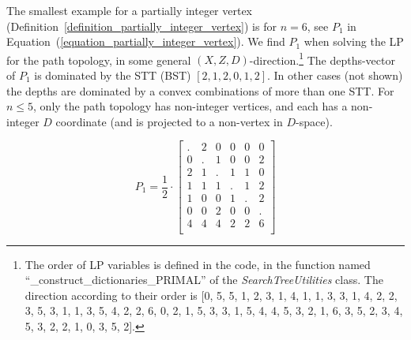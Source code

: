 \begin{example}
\label{figure_Example_partially_interger_vertex}
The smallest example for a partially integer vertex (Definition~\ref{definition_partially_integer_vertex}) is for $n=6$, see $P_1$ in Equation~(\ref{equation_partially_integer_vertex}). We find $P_1$ when solving the LP for the path topology, in some general $(X,Z,D)$-direction.\footnote{
The order of LP variables is defined in the code, in the function named ``\_construct\_dictionaries\_PRIMAL'' of the \emph{SearchTreeUtilities} class. The direction according to their order is [0, 5, 5, 1, 2, 3, 1, 4, 1, 1, 3, 3, 1, 4, 2, 2, 3, 5, 3, 1, 1, 3, 5, 4, 2, 2, 6, 0, 2, 1, 5, 3, 3, 1, 5, 4, 4, 5, 3, 2, 1, 6, 3, 5, 2, 3, 4, 5, 3, 2, 2, 1, 0, 3, 5, 2].} The depths-vector of $P_1$ is dominated by the STT (BST) $[2,1,2,0,1,2]$. In other cases (not shown) the depths are dominated by a convex combinations of more than one STT. For $n \le 5$, only the path topology has non-integer vertices, and each has a non-integer $D$ coordinate (and is projected to a non-vertex in $D$-space).

{\scriptsize
\begin{equation}
\label{equation_partially_integer_vertex}
P_1 = \frac{1}{2} \cdot 
\begin{bmatrix}
. & 2 & 0 & 0 & 0 & 0 \\
0 & . & 1 & 0 & 0 & 2 \\
2 & 1 & . & 1 & 1 & 0 \\
1 & 1 & 1 & . & 1 & 2 \\
1 & 0 & 0 & 1 & . & 2 \\
0 & 0 & 2 & 0 & 0 & . \\
\hline
4 & 4 & 4 & 2 & 2 & 6 \\
\end{bmatrix}
\end{equation}
}
\end{example}


